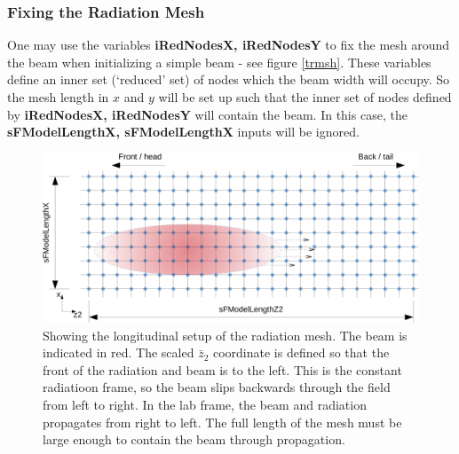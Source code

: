 \documentclass[12pt]{article}%
\begin{document}
\subsubsection{Fixing the Radiation Mesh}

One may use the variables {\bf iRedNodesX, iRedNodesY} to fix the mesh around the beam when initializing a simple beam - see figure \ref{trmsh}. These variables define an inner set (`reduced' set) of nodes which the beam width will occupy. So the mesh length in $x$ and $y$ will be set up such that the inner set of nodes defined by  {\bf iRedNodesX, iRedNodesY} will contain the beam. In this case, the {\bf sFModelLengthX, sFModelLengthX} inputs will be ignored.


\begin{figure}
\centering
\includegraphics[width=150mm]{long_mesh.png}
\caption{Showing the longitudinal setup of the radiation mesh. The beam is indicated in red. The scaled $\bar{z}_2$ coordinate is defined so that the front of the radiation and beam is to the left. This is the constant radiatioon frame, so the beam slips backwards through the field from left to right. In the lab frame, the beam and radiation propagates from right to left. The full length of the mesh must be large enough to contain the beam through propagation.}
\label{lgmsh}
\end{figure}
\end{document}
